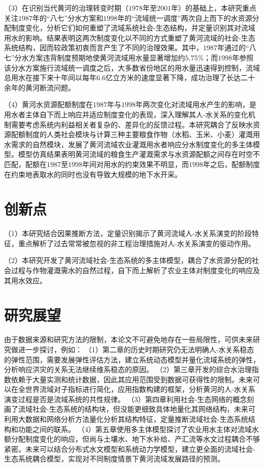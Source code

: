（3）在识别当代黄河的治理转变时期（$1978$年至$2001$年）的基础上，本研究重点关注$1987$年的“八七”分水方案和$1998$年的“流域统一调度”两次自上而下的水资源分配制度变化，分析它们如何重塑了流域系统社会-生态结构，并定量识别其对流域用水的影响。结果表明这两次制度变化以不同的方式重塑了黄河流域的社会-生态系统结构，因而较政策初衷而言产生了不同的治理效果。其中，$1987$年通过的“八七”分水方案违背制度预期地使黄河流域用水量显著增加约$5.75\%$；而$1998$年参照该分水方案施行流域统一调度之后，大多数省份地区的用水量迅速得到控制，流域总用水在接下来十年间以每年$6.6$亿立方米的速度显著下降，成功治理了长达二十余年的黄河断流问题。

（4）黄河水资源配额制度在$1987$年与$1998$年两次变化对流域用水产生的影响，是用水者主体自下而上响应并适应制度变化的表现，深入理解其人-水关系的变化机制需要考虑系统内利益相关者复杂的、差异化的反馈过程。本研究耦合了反映水资源配额制度的人类社会模块与计算三种主要粮食作物（水稻、玉米、小麦）灌溉用水需求的自然模块，发展了黄河流域农业灌溉用水者响应分水制度变化的多主体模型。模型仿真结果表明黄河流域的粮食生产灌溉需求与水资源配额之间存在时空不匹配，配额在$1987$至$1998$年间对用水的约束效果不明显，而$1998$年之后，配额制度在约束地表取水的同时也没有导致大规模的地下水开采。

\section{创新点}

（1）本研究结合因果推断方法，定量识别揭示了黄河流域人-水关系演变的阶段特征，重点解析了过去常常被忽视的非工程治理措施对人-水关系演变的驱动作用。

（2）本研究开发了黄河流域社会-生态系统的多主体模型，耦合了水资源分配的社会过程与作物灌溉需水的自然过程，自下而上解析了农业主体对制度变化的响应及其用水效应。

\section{研究展望}

由于数据来源和研究方法的限制，本论文不可避免地存在一些局限性，可供未来研究做进一步探讨，例如：
（1）第二章的历史时期研究仍无法明确人-水关系稳态的弹性范围，需要发展弹性评估方法，建立系统动态模型并量化流域系统的弹性，分析响应洪灾的关系无法继续维系稳态的原因。
（2）第三章开发的综合水治理指数依赖于大量实测和统计数据，因此其应用范围受到数据可获得性的限制。未来可以在全世界流域对子指标进行简化，应用指数构建的框架，分析黄河的人-水关系演变过程是否是流域系统的共性规律。
（3）第四章利用社会-生态网络的概念刻画了流域社会-生态系统的结构块，但没能更细致具体地量化其网络结构，未来可利用大数据和网络分析方法量化分析其结构特征，定量推断流域社会-生态系统结构和功能之间的联系。
（4）第五章使用多主体模型探讨了农业用水主体对流域水额分配制度变化的响应，但尚与土壤水、地下水补给、产汇流等水文过程耦合不够紧密。未来可以结合分布式水文模型和系统动力学模型，建立更全面的流域社会-生态系统耦合模型，实现对不同制度情景下黄河流域发展路径的预测。


